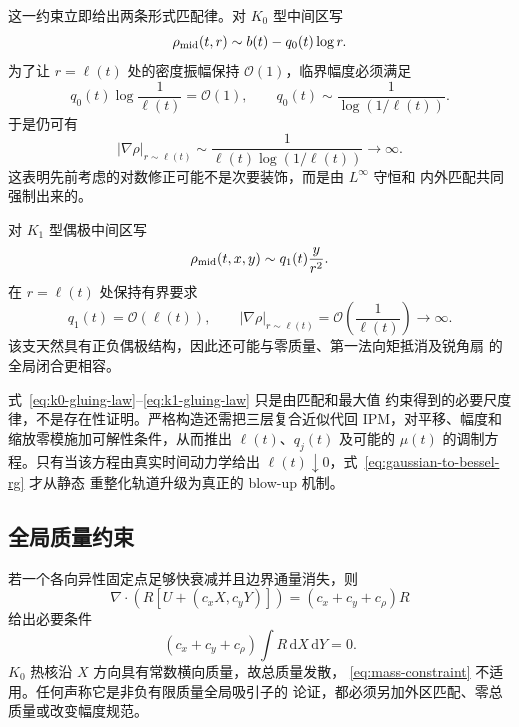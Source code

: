 \documentclass[11pt,a4paper,fontset=fandol]{ctexart}
\newcommand{\dd}{\,\mathrm d}
\newcommand{\grad}{\nabla}
\newcommand{\abs}[1]{\left\lvert #1\right\rvert}
\newcommand{\Order}{\mathcal O}
\begin{document}
这一约束立即给出两条形式匹配律。对 $K_0$ 型中间区写
\begin{equation}
  \rho_{\rm mid}(t,r)
  \sim b(t)-q_0(t)\log r.
\end{equation}
为了让 $r=\ell(t)$ 处的密度振幅保持 $\Order(1)$，临界幅度必须满足
\begin{equation}
  q_0(t)\log\frac1{\ell(t)}=\Order(1),
  \qquad
  q_0(t)\sim\frac{1}{\log(1/\ell(t))}.
  \label{eq:k0-gluing-law}
\end{equation}
于是仍可有
\begin{equation}
  \abs{\grad\rho}_{r\sim\ell(t)}
  \sim\frac{1}{\ell(t)\log(1/\ell(t))}\to\infty.
  \label{eq:k0-glued-gradient}
\end{equation}
这表明先前考虑的对数修正可能不是次要装饰，而是由 $L^\infty$ 守恒和
内外匹配共同强制出来的。

对 $K_1$ 型偶极中间区写
\begin{equation}
  \rho_{\rm mid}(t,x,y)\sim q_1(t)\frac{y}{r^2}.
\end{equation}
在 $r=\ell(t)$ 处保持有界要求
\begin{equation}
  q_1(t)=\Order(\ell(t)),
  \qquad
  \abs{\grad\rho}_{r\sim\ell(t)}
  =\Order\!\left(\frac1{\ell(t)}\right)\to\infty.
  \label{eq:k1-gluing-law}
\end{equation}
该支天然具有正负偶极结构，因此还可能与零质量、第一法向矩抵消及锐角扇
的全局闭合更相容。

式~\eqref{eq:k0-gluing-law}--\eqref{eq:k1-gluing-law} 只是由匹配和最大值
约束得到的必要尺度律，不是存在性证明。严格构造还需把三层复合近似代回
IPM，对平移、幅度和缩放零模施加可解性条件，从而推出 $\ell(t)$、$q_j(t)$
及可能的 $\mu(t)$ 的调制方程。只有当该方程由真实时间动力学给出
$\ell(t)\downarrow0$，式~\eqref{eq:gaussian-to-bessel-rg} 才从静态
重整化轨道升级为真正的 blow-up 机制。

\subsection{全局质量约束}

若一个各向异性固定点足够快衰减并且边界通量消失，则
\begin{equation}
  \grad\cdot\left(R[U+(c_xX,c_yY)]\right)
  =(c_x+c_y+c_\rho)R
\end{equation}
给出必要条件
\begin{equation}
  (c_x+c_y+c_\rho)\int R\dd X\dd Y=0.
  \label{eq:mass-constraint}
\end{equation}
$K_0$ 热核沿 $X$ 方向具有常数横向质量，故总质量发散，
\eqref{eq:mass-constraint} 不适用。任何声称它是非负有限质量全局吸引子的
论证，都必须另加外区匹配、零总质量或改变幅度规范。
\end{document}
